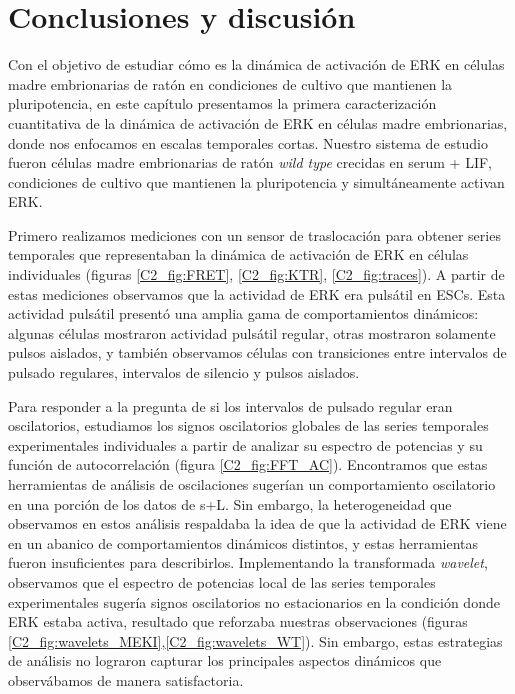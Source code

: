 \documentclass[./main.tex]{subfiles}
\begin{document}
\section{Conclusiones y discusión}

Con el objetivo de estudiar cómo es la dinámica de activación de ERK en células madre embrionarias de ratón en condiciones de cultivo que mantienen la pluripotencia, en este capítulo presentamos la primera caracterización cuantitativa de la dinámica de activación de ERK en células madre embrionarias, donde nos enfocamos en escalas temporales cortas. Nuestro sistema de estudio fueron células madre embrionarias de ratón \textit{wild type} crecidas en serum + LIF, condiciones de cultivo que mantienen la pluripotencia y simultáneamente activan ERK. 


Primero realizamos mediciones con un sensor de traslocación para obtener series temporales que representaban la dinámica de activación de ERK en células individuales (figuras \ref{C2_fig:FRET}, \ref{C2_fig:KTR}, \ref{C2_fig:traces}). A partir de estas mediciones observamos que la actividad de ERK era pulsátil en ESCs. Esta actividad pulsátil presentó una amplia gama de comportamientos dinámicos: algunas células mostraron actividad pulsátil regular, otras mostraron solamente pulsos aislados, y también observamos células con transiciones entre intervalos de pulsado regulares, intervalos de silencio y pulsos aislados. 


Para responder a la pregunta de si los intervalos de pulsado regular eran oscilatorios, estudiamos los signos oscilatorios globales de las series temporales experimentales individuales a partir de analizar su espectro de potencias y su función de autocorrelación (figura \ref{C2_fig:FFT_AC}). Encontramos que estas herramientas de análisis de oscilaciones sugerían un comportamiento oscilatorio en una porción de los datos de s+L. Sin embargo, la heterogeneidad que observamos en estos análisis respaldaba la idea de que la actividad de ERK viene en un abanico de comportamientos dinámicos distintos, y estas herramientas fueron insuficientes para describirlos. Implementando la transformada \textit{wavelet}, observamos que el espectro de potencias local de las series temporales experimentales sugería signos oscilatorios no estacionarios en la condición donde ERK estaba activa, resultado que reforzaba nuestras observaciones (figuras \ref{C2_fig:wavelets_MEKI},\ref{C2_fig:wavelets_WT}). Sin embargo, estas estrategias de análisis no lograron capturar los principales aspectos dinámicos 
 que observábamos de manera satisfactoria. 
 
\end{document}

